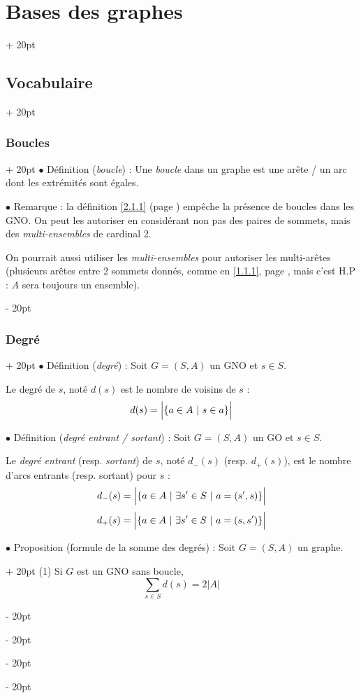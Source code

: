 \documentclass[a4paper, 12pt, twoside]{article}
\newcommand{\set}[1]{\left\{ #1 \right\}}
\newcommand{\abs}[1]{\left\lvert #1 \right\rvert}
\newcommand{\ind}[1][20pt]{\advance\leftskip + #1}
\newcommand{\deind}[1][20pt]{\advance\leftskip - #1}
\newenvironment{indt}[2][20pt]{#2 \par \ind[#1]}{\par \deind} %
\begin{document}
\begin{indt}{\section{Bases des graphes}}
\begin{indt}{\subsection{Vocabulaire}}
            \begin{indt}{\subsubsection{Boucles}}
                $\bullet$ Définition (\textit{boucle}) : Une \textit{boucle} dans un graphe est une arête / un arc dont les extrémités sont égales.

                $\bullet$ Remarque : la définition \ref{2.1.1} (page \pageref{2.1.1}) empêche la présence de boucles dans les GNO.
                On peut les autoriser en considérant non pas des paires de sommets, mais des \textit{multi-ensembles} de cardinal 2.

                On pourrait aussi utiliser les \textit{multi-ensembles} pour autoriser les multi-arêtes (plusieurs arêtes entre 2 sommets donnés, comme en \ref{1.1.1}, page \pageref{1.1.1}, mais c'est H.P : $A$ sera toujours un ensemble).
            \end{indt}

            \vspace{12pt}
            
            \begin{indt}{\subsubsection{Degré}}
                $\bullet$ Définition (\textit{degré}) : Soit $G = (S, A)$ un GNO et $s \in S$.

                Le degré de $s$, noté $d(s)$  est le nombre de voisins de $s$ :
                \[
                    d(s) = \abs{\vphantom{\dfrac a a}\!\set{a \in A\ |\ s \in a}}
                \]
                
                $\bullet$ Définition (\textit{degré entrant / sortant}) : Soit $G = (S, A)$ un GO et $s \in S$.

                Le \textit{degré entrant} (resp. \textit{sortant}) de $s$, noté $d_-(s)$  (resp. $d_+(s)$), est le nombre d'arcs entrants (resp. sortant) pour $s$ :
                \[
                    d_-(s) = \abs{\vphantom{\dfrac a a}\!\set{a \in A\ |\ \exists s' \in S\ |\ a = (s', s)}}
                \]
                \[
                    d_+(s) = \abs{\vphantom{\dfrac a a}\!\set{a \in A\ |\ \exists s' \in S\ |\ a = (s, s')}}
                \]
                
                \begin{indt}{$\bullet$ Proposition (formule de la somme des degrés) : Soit $G = (S, A)$ un graphe.}
                    (1) Si $G$ est un GNO sans boucle,
                    \[
                        \sum_{s \in S} d(s) = 2\abs{A}
                    \]


\end{indt}
\end{indt}
\end{indt}
\end{indt}
\end{document}
